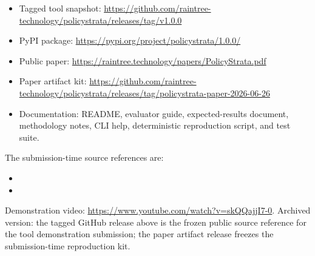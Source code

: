 \documentclass[sigconf]{acmart}
\newcommand{\DemoVideoUrl}{https://www.youtube.com/watch?v=skQQajjI7-0}
\begin{document}
\begin{itemize}
  \item Tagged tool snapshot: \url{https://github.com/raintree-technology/policystrata/releases/tag/v1.0.0}
  \item PyPI package: \url{https://pypi.org/project/policystrata/1.0.0/}
  \item Public paper: \url{https://raintree.technology/papers/PolicyStrata.pdf}
  \item Paper artifact kit: \url{https://github.com/raintree-technology/policystrata/releases/tag/policystrata-paper-2026-06-26}
  \item Documentation: README, evaluator guide, expected-results document, methodology notes, CLI help, deterministic reproduction script, and test suite.
\end{itemize}

The submission-time source references are:

\begin{itemize}
  \item {}
  \item {}
\end{itemize}

Demonstration video: \url{\DemoVideoUrl}. Archived version: the tagged GitHub release above is the frozen public source reference for the tool demonstration submission; the paper artifact release freezes the submission-time reproduction kit.



\end{document}
